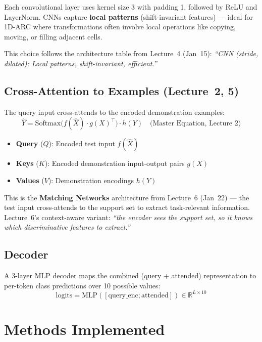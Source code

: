 \documentclass[11pt,a4paper]{article}
\begin{document}
Each convolutional layer uses kernel size 3 with padding 1, followed by ReLU and LayerNorm. CNNs capture \textbf{local patterns} (shift-invariant features) --- ideal for 1D-ARC where transformations often involve local operations like copying, moving, or filling adjacent cells.

This choice follows the architecture table from Lecture~4 (Jan~15): \emph{``CNN (stride, dilated): Local patterns, shift-invariant, efficient.''}

\subsection{Cross-Attention to Examples (Lecture~2, 5)}

The query input cross-attends to the encoded demonstration examples:
\begin{equation}
    \hat{Y} = \text{Softmax}\bigl(f(\hat{X}) \cdot g(X)^\top\bigr) \cdot h(Y) \quad \text{(Master Equation, Lecture~2)}
\end{equation}

\begin{itemize}[nosep]
    \item \textbf{Query} ($Q$): Encoded test input $f(\hat{X})$
    \item \textbf{Keys} ($K$): Encoded demonstration input-output pairs $g(X)$
    \item \textbf{Values} ($V$): Demonstration encodings $h(Y)$
\end{itemize}

This is the \textbf{Matching Networks} architecture from Lecture~6 (Jan~22) --- the test input cross-attends to the support set to extract task-relevant information. Lecture~6's context-aware variant: \emph{``the encoder sees the support set, so it knows which discriminative features to extract.''}

\subsection{Decoder}

A 3-layer MLP decoder maps the combined (query + attended) representation to per-token class predictions over 10 possible values:
\begin{equation}
    \text{logits} = \text{MLP}([\text{query\_enc}; \text{attended}]) \in \mathbb{R}^{L \times 10}
\end{equation}

\section{Methods Implemented}
\end{document}
